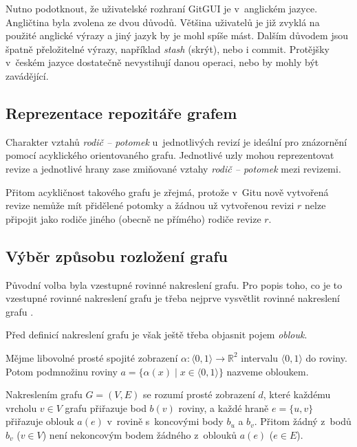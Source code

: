 \documentclass[
  biblatex,
  glossaries,
  index
]{kidiplom}
\begin{document}
Nutno podotknout, že uživatelské rozhraní GitGUI je v~anglickém jazyce. Angličtina byla zvolena ze dvou důvodů. Většina uživatelů je již zvyklá na použité anglické výrazy a jiný jazyk by je mohl spíše mást. Dalším důvodem jsou špatně přeložitelné výrazy, například \textit{stash} (skrýt), nebo i commit. Protějšky v~českém jazyce dostatečně nevystihují danou operaci, nebo by mohly být zavádějící.

\subsection{Reprezentace repozitáře grafem}
Charakter vztahů {\it rodič -- potomek} u~jednotlivých revizí je ideální pro znázornění pomocí acyklického orientovaného grafu. Jednotlivé uzly mohou reprezentovat revize a jednotlivé hrany zase zmiňované vztahy {\it rodič -- potomek} mezi revizemi.

Přitom acykličnost takového grafu je zřejmá, protože v~Gitu nově vytvořená revize nemůže mít přidělené potomky a žádnou už vytvořenou revizi $r$ nelze připojit jako rodiče jiného (obecně ne přímého) rodiče revize $r$.

\subsection{Výběr způsobu rozložení grafu}

Původní volba byla vzestupné rovinné nakreslení grafu. Pro popis toho, co je to vzestupné rovinné nakreslení grafu je třeba nejprve vysvětlit rovinné nakreslení grafu \cite{discmat}.

Před definicí nakreslení grafu je však ještě třeba objasnit pojem {\it oblouk}.

\begin{definition}
Mějme libovolné prosté spojité zobrazení $\alpha\colon\langle 0,1\rangle\to\mathbb{R}^2$ intervalu $\langle 0,1\rangle$ do roviny. Potom podmnožinu roviny $a=\{\alpha(x)\mid x\in\langle 0,1\rangle\}$ nazveme obloukem.
\end{definition}

\begin{definition}
Nakreslením grafu $G=(V,E)$ se rozumí prosté zobrazení $d$, které každému vrcholu $v\in V$ grafu přiřazuje bod $b(v)$ roviny, a každé hraně $e=\{u,v\}$ přiřazuje oblouk $a(e)$ v~rovině s~koncovými body $b_u$ a $b_v$. Přitom žádný z~bodů $b_v$ ($v\in V$) není
nekoncovým bodem žádného z~oblouků $a(e)$ ($e\in E$).
\end{definition}
\end{document}
